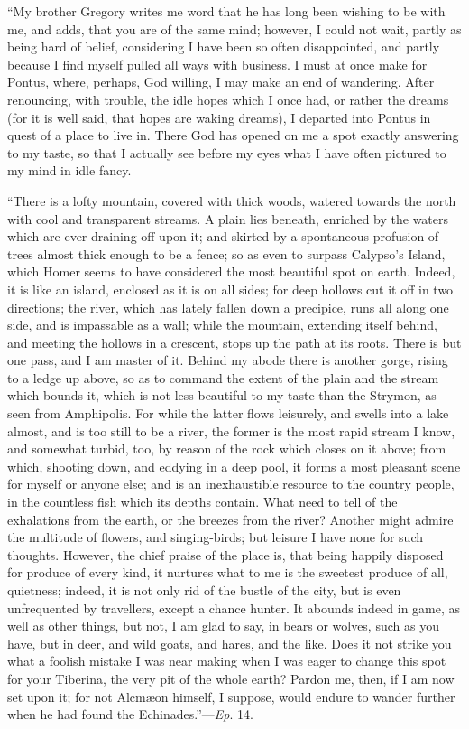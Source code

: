 ``My brother Gregory writes me word that he has long been
wishing to be with me, and adds, that you are of the same mind;
however, I could not wait, partly as being hard of belief, considering
I have been so often disappointed, and partly because I find myself
pulled all ways with business. I must at once make for Pontus, where,
perhaps, God willing, I may make an end of wandering. After
renouncing, with trouble, the idle hopes which I once had, or rather
the dreams (for it is well said, that hopes are waking dreams), I
departed into Pontus in quest of a place to live in. There God has
opened on me a spot exactly answering to my taste, so that I actually
see before my eyes what I have often pictured to my mind in idle
fancy.

``There is a lofty mountain, covered with thick woods, watered
towards the north with cool and transparent streams. A plain lies
beneath, enriched by the waters which are ever draining off upon it;
and skirted by a spontaneous profusion of trees almost thick enough to
be a fence; so as even to surpass Calypso's Island, which Homer seems
to have considered the most beautiful spot on earth. Indeed, it is
like an island, enclosed as it is on all sides; for deep hollows cut
it off in two directions; the river, which has lately fallen down a
precipice, runs all along one side, and is impassable as a wall; while
the mountain, extending itself behind, and meeting the hollows in a
crescent, stops up the path at its roots. There is but one pass, and I
am master of it. Behind my abode there is another gorge, rising to a
ledge up above, so as to command the extent of the plain and the
stream which bounds it, which is not less beautiful to my taste than
the Strymon, as seen from Amphipolis. For while the latter flows
leisurely, and swells into a lake almost, and is too still to be a
river, the former is the most rapid stream I know, and somewhat
turbid, too, by reason of the rock which closes on it above; from
which, shooting down, and eddying in a deep pool, it forms a most
pleasant scene for myself or anyone else; and is an inexhaustible
resource to the country people, in the countless fish which its depths
contain. What need to tell of the exhalations from the earth, or the
breezes from the river? Another might
admire the multitude of flowers, and singing-birds; but leisure I have
none for such thoughts. However, the chief praise of the place is,
that being happily disposed for produce of every kind, it nurtures
what to me is the sweetest produce of all, quietness; indeed, it is
not only rid of the bustle of the city, but is even unfrequented by
travellers, except a chance hunter. It abounds indeed in game, as well
as other things, but not, I am glad to say, in bears or wolves, such
as you have, but in deer, and wild goats, and hares, and the like.
Does it not strike you what a foolish mistake I was near making when I
was eager to change this spot for your Tiberina, the very pit of the
whole earth? Pardon me, then, if I am now set upon it; for not
Alcmæon himself, I suppose, would endure to wander further when he
had found the Echinades.''—\emph{Ep}. 14.

